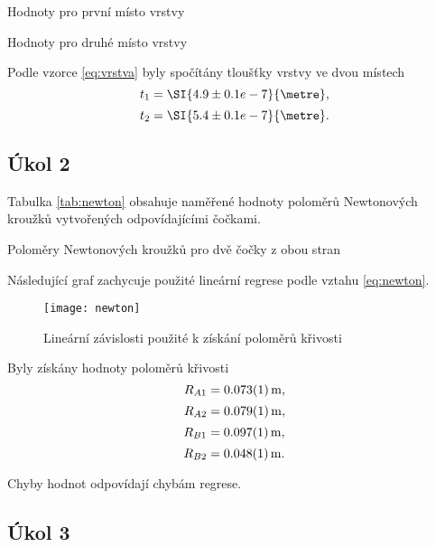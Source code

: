\documentclass{protokol}
\begin{document}
      \begin{table}[H]
        \centering
        \setlength{\tabcolsep}{10pt}
        
        \caption{Hodnoty pro první místo vrstvy}
        \label{tab:vrstva1}
      \end{table}
      
      \begin{table}[H]
        \centering
        \setlength{\tabcolsep}{10pt}
        
        \caption{Hodnoty pro druhé místo vrstvy}
        \label{tab:vrstva2}
      \end{table}

      Podle vzorce \eqref{eq:vrstva} byly spočítány tloušťky vrstvy ve dvou místech
      $$ t_1 = \SI{4.9 \pm 0.1 e-7}{\metre}, $$
      $$ t_2 = \SI{5.4 \pm 0.1 e-7}{\metre}. $$
    
    \subsection*{Úkol 2}

      Tabulka \ref{tab:newton} obsahuje naměřené hodnoty poloměrů Newtonových kroužků vytvořených odpovídajícími čočkami. 
      
      \begin{table}[H]
        \centering
        \setlength{\tabcolsep}{10pt}
        
        \caption{Poloměry Newtonových kroužků pro dvě čočky z obou stran}
        \label{tab:newton}
      \end{table}

      Následující graf zachycuje použité lineární regrese podle vztahu \eqref{eq:newton}.
      
      \begin{figure}[H]
        \centering
        \texttt{[image: newton]}
        \caption{Lineární závislosti použité k získání poloměrů křivosti}
        \label{fig:newton}
      \end{figure}

      Byly získány hodnoty poloměrů křivosti
      $$ R_{A1} = \SI{0.073 \pm 0.001}{m}, $$
      $$ R_{A2} = \SI{0.079 \pm 0.001}{m}, $$
      $$ R_{B1} = \SI{0.097 \pm 0.001}{m}, $$
      $$ R_{B2} = \SI{0.048 \pm 0.001}{m}. $$

      Chyby hodnot odpovídají chybám regrese.

    \subsection*{Úkol 3}
      
\end{document}

